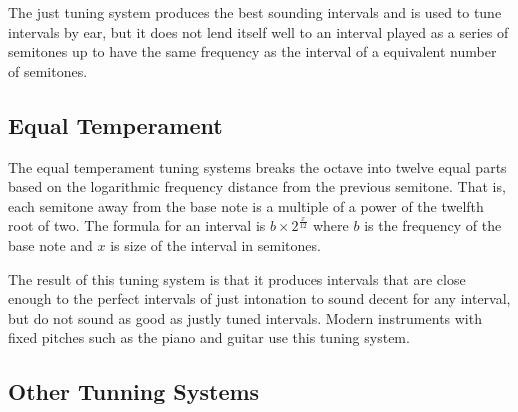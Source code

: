 The just tuning system produces the best sounding intervals and is used to tune intervals by ear, but it does not lend itself well to an interval played as a series of semitones up to have the same frequency as the interval of a equivalent number of semitones.

\subsection{Equal Temperament} \label{mathinmusic:intervals:equal}

The equal temperament tuning systems breaks the octave into twelve equal parts based on the logarithmic frequency distance from the previous semitone.
That is, each semitone away from the base note is a multiple of a power of the twelfth root of two.
The formula for an interval is $b \times 2^{\frac{x}{12}}$ where $b$ is the frequency of the base note and $x$ is size of the interval in semitones.

The result of this tuning system is that it produces intervals that are close enough to the perfect intervals of just intonation to sound decent for any interval, but do not sound as good as justly tuned intervals.
Modern instruments with fixed pitches such as the piano and guitar use this tuning system.

\subsection{Other Tunning Systems} \label{mathinmusic:intervals:othertuning}



